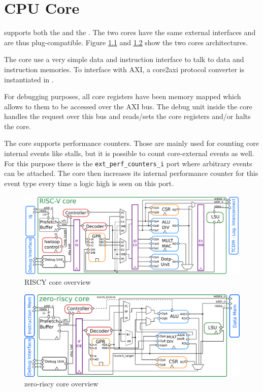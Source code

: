 \chapter{CPU Core}

\pulpino supports both the \riscv \rvcore and the \riscv \zerocore. The two
cores have the same external interfaces and are thus plug-compatible.
Figure \ref{fig:riscy_core} and \ref{fig:zero_core} show the two cores
architectures.

The core use a very simple data and instruction interface to talk to data and
instruction memories. To interface with AXI, a core2axi protocol converter is
instantiated in \pulpino.

For debugging purposes, all core registers have been memory mapped which allows
to them to be accessed over the AXI bus. The debug unit inside the core handles
the request over this bus and reads/sets the core registers and/or halts the core.

The core supports performance counters. Those are mainly used for counting core
internal events like stalls, but it is possible to count core-external events
as well. For this purpose there is the \texttt{ext\_perf\_counters\_i} port where
arbitrary events can be attached. The core then increases its internal
performance counter for this event type every time a logic high is seen on this
port.

\begin{figure}[ht]
  \centering
  \includegraphics[width=\textwidth]{./figures/riscy_archi.png}
  \caption{RISCY core overview}
  \label{fig:riscy_core}
\end{figure}

\begin{figure}[ht]
  \centering
  \includegraphics[width=\textwidth]{./figures/zeroriscy_archi.png}
  \caption{zero-riscy core overview}
  \label{fig:zero_core}
\end{figure}
